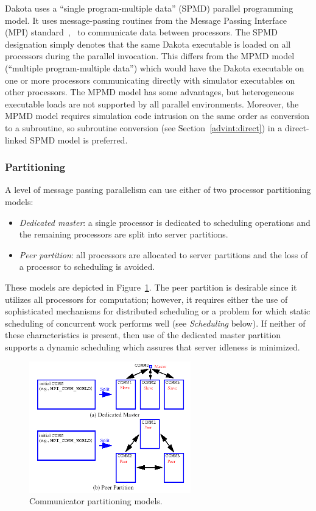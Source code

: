 Dakota uses a ``single program-multiple data'' (SPMD) parallel
programming model. It uses message-passing routines from the Message
Passing Interface (MPI) standard~\cite{Gro94},~\cite{Sni96} to
communicate data between processors. The SPMD designation simply
denotes that the same Dakota executable is loaded on all processors
during the parallel invocation. This differs from the MPMD model
(``multiple program-multiple data'') which would have the Dakota
executable on one or more processors communicating directly with
simulator executables on other processors. The MPMD model has some
advantages, but heterogeneous executable loads are not supported by
all parallel environments. Moreover, the MPMD model requires
simulation code intrusion on the same order as conversion to a
subroutine, so subroutine conversion (see Section~\ref{advint:direct})
in a direct-linked SPMD model is preferred.

\subsubsection{Partitioning}\label{parallel:SLP:message:part}

A level of message passing parallelism can use either of two processor
partitioning models:
\begin{itemize}
\item \emph{Dedicated master}: a single processor is dedicated to
scheduling operations and the remaining processors are split into
server partitions.
\item \emph{Peer partition}: all processors are allocated to server
partitions and the loss of a processor to scheduling is avoided.
\end{itemize}
These models are depicted in Figure~\ref{parallel:figure01}. The peer
partition is desirable since it utilizes all processors for
computation; however, it requires either the use of sophisticated
mechanisms for distributed scheduling or a problem for which static
scheduling of concurrent work performs well (see \emph{Scheduling}
below).  If neither of these characteristics is present, then use of
the dedicated master partition supports a dynamic scheduling which
assures that server idleness is minimized.

\begin{figure}[ht]
  \centering
  \includegraphics[width=70mm]{images/comm_partitioning}
  \caption{Communicator partitioning models.}
  \label{parallel:figure01}
\end{figure}

